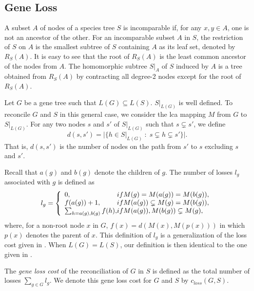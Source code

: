 \documentclass[9.5pt,journal,letterpaper,compsoc]{IEEEtran}
\begin{document}
\subsection{Gene Loss}

A subset $A$ of nodes of a species tree $S$ is
 incomparable if, for any $x, y\in A$, one is not an ancestor of the other.
 For an incomparable subset $A$ in $S$, the restriction of $S$ on $A$ is the smallest
subtree of $S$ containing $A$ as its leaf set, denoted by $R_S(A)$.
It is easy to see that the root of $R_S(A)$ is the least common
ancestor of the nodes from $A$. The homomorphic subtree $S|_A$ of
$S$ induced by $A$ is a tree obtained from $R_S(A)$ by contracting
all degree-2 nodes except for the root of $R_S(A)$.

Let $G$ be a gene tree such that  $L(G)\subseteq L(S)$.
 $S|_{L(G)}$ is well defined.
To reconcile $G$ and $S$ in this general case, we consider the lca
mapping $M$ from $G$ to $S|_{L(G)}$. For any two nodes  $s$ and $s'$
of $S|_{L(G)}$ such that $s\subsetneq s'$,
 we define
$$
 d(s, s')=|\{ h\in S|_{L(G)}\;:\; s \subsetneq h \subsetneq s'\}|.
$$
That is, $d(s, s')$ is the number of nodes on the path from $s'$ to
$s$ excluding $s$ and $s'$.

Recall that $a(g)$ and $b(g)$ denote the children of $g$. The number
of losses $l_g$ associated with $g$ is defined as
\begin{eqnarray*}
l_g=\left\{ \begin{array}{ll}
  0, &\hspace{-1em}  \mbox{ if } M(g)=M(a(g))=M(b(g)),\\
f(a(g)) +1, & \hspace{-1em} \mbox{ if }  M(a(g))\subsetneq M(g)= M(b(g)),\\
\sum_{h=a(g),b(g)}f(h), & \hspace{-1em} \mbox{ if }
M(a(g)), M(b(g))\subsetneq M(g),
\end{array}
\right.
\end{eqnarray*}
where, for a non-root node $x$ in $G$, $f(x)=d\left(M(x),
M\left(p(x)\right)\right)$ in which $p(x)$
 denotes the parent of $x$.
%
 This definition of $l_g$ is a generalization of  the loss cost given
in \cite{Guigo_MPE_96}. When $L(G)=L(S)$, our definition  is then
identical to the one given in \cite{Guigo_MPE_96}.

The {\it gene loss cost} of the reconciliation of $G$ in $S$ is
defined as the total number of losses $\sum_{g\in G} l_g$. We denote
this gene loss cost for $G$ and $S$  by $c_{loss}(G, S)$.
\end{document}
